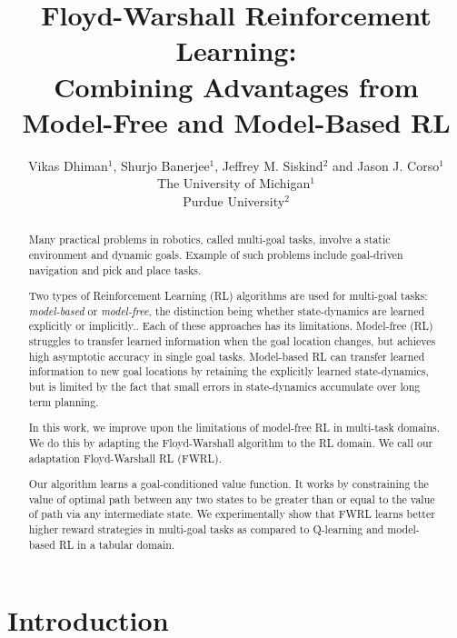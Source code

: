 \documentclass[letterpaper]{article} %
\title{Floyd-Warshall Reinforcement Learning: \\Combining Advantages from
Model-Free and Model-Based RL}
\author{Vikas Dhiman$^1$, Shurjo Banerjee$^1$, Jeffrey M. Siskind$^2$ and Jason J.
Corso$^1$\\
The University of Michigan$^1$\\
Purdue University$^2$}
\begin{document}
\maketitle
\begin{abstract}
Many practical problems in robotics, called multi-goal tasks, involve a static environment and dynamic goals.
Example of such problems include goal-driven navigation and pick and place
tasks.

Two types of Reinforcement Learning (RL) algorithms are used for
multi-goal tasks: 
\emph{model-based} or \emph{model-free}, the distinction being whether state-dynamics are
learned explicitly or implicitly.. Each of these approaches has its limitations.
Model-free (RL) struggles to transfer learned information when the goal location
changes, but achieves high asymptotic accuracy in single goal tasks. Model-based
RL can transfer learned information to new goal locations by retaining the
explicitly learned state-dynamics, but is limited by the fact that small errors in
state-dynamics accumulate over long term planning.

In this work, we improve upon the limitations of model-free RL in
multi-task domains. 
We do this by adapting the Floyd-Warshall algorithm to
the RL domain. We call our adaptation Floyd-Warshall RL (FWRL).

Our algorithm learns a goal-conditioned value function. 
It works by constraining the value of
optimal path between any two states to be greater than or equal to the value of
path via any intermediate state.
We experimentally show that FWRL learns better higher reward strategies in
multi-goal tasks as compared to Q-learning and model-based RL in a
tabular domain.
\end{abstract}


\section{ Introduction}



%













%


\end{document}
